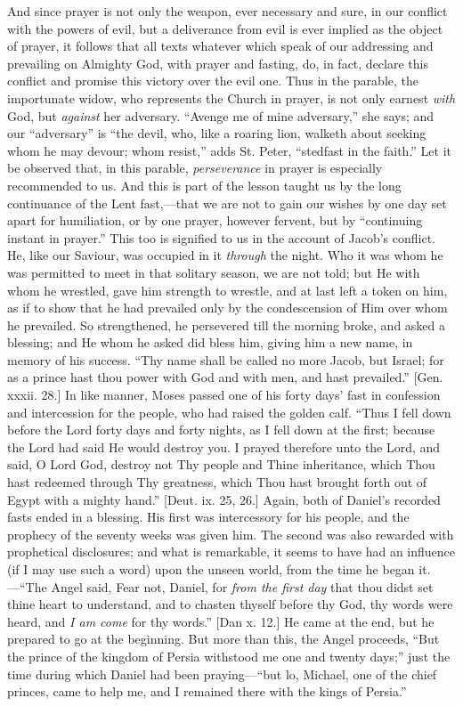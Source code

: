And since prayer is not only the weapon, ever necessary and sure,
in our conflict with the powers of evil, but a deliverance from evil
is ever implied as the object of prayer, it follows that all texts
whatever which speak of our addressing and prevailing on Almighty God,
with prayer and fasting, do, in fact, declare this conflict and
promise this victory over the evil one. Thus in the parable, the
importunate widow, who represents the Church in prayer, is not only
earnest \emph{with} God, but \emph{against} her adversary.
``Avenge me of mine adversary,'' she says; and our
``adversary'' is ``the devil, who, like a roaring lion,
walketh about seeking whom he may devour; whom resist,'' adds St.
Peter, ``stedfast in the faith.'' Let it be observed that, in
this parable, \emph{perseverance} in prayer is especially recommended
to us. And this is part of the lesson taught us by the long
continuance of the Lent fast,—that we are not to gain our wishes by
one day set apart for humiliation, or by one prayer, however fervent,
but by ``continuing instant in prayer.'' This too is signified
to us in the account of Jacob's conflict. He, like our Saviour, was
occupied in it \emph{through} the night. Who it was whom he was
permitted to meet in that solitary season, we are not told; but He
with whom he wrestled, gave him strength to wrestle, and at last left
a token on him, as if to show that he had prevailed only by the
condescension of Him over whom he prevailed. So strengthened, he
persevered till the morning broke, and asked a blessing; and He whom
he asked did bless him, giving him a new name, in memory of his
success. ``Thy name shall be called no more Jacob, but Israel; for
as a prince hast thou power with God and with men, and hast
prevailed.'' [Gen. xxxii. 28.] In like manner, Moses passed one of
his forty days' fast in confession and intercession for the people,
who had raised the golden calf. ``Thus I fell down before the Lord
forty days and forty nights, as I fell down at the first; because the
Lord had said He would destroy you. I prayed therefore unto the Lord,
and said, O Lord God, destroy not Thy people and Thine inheritance,
which Thou hast redeemed through Thy greatness, which Thou hast
brought forth out of Egypt with a mighty hand.'' [Deut. ix. 25,
26.] Again, both of Daniel's recorded fasts ended in a blessing. His
first was intercessory for his people, and the prophecy of the seventy
weeks was given him. The second was also rewarded with prophetical
disclosures; and what is remarkable, it seems to have had an influence
(if I may use such a word) upon the unseen world, from the time he
began it.—``The Angel said, Fear not, Daniel, for \emph{from the
first day} that thou didst set thine heart to understand, and to
chasten thyself before thy God, thy words were heard, and \emph{I am come}
for thy words.'' [Dan x. 12.] He came at the end, but he prepared
to go at the beginning. But more than this, the Angel proceeds,
``But the prince of the kingdom of Persia withstood me one and
twenty days;'' just the time during which Daniel had been praying—``but
lo, Michael, one of the chief princes, came to help me, and I remained
there with the kings of Persia.''

